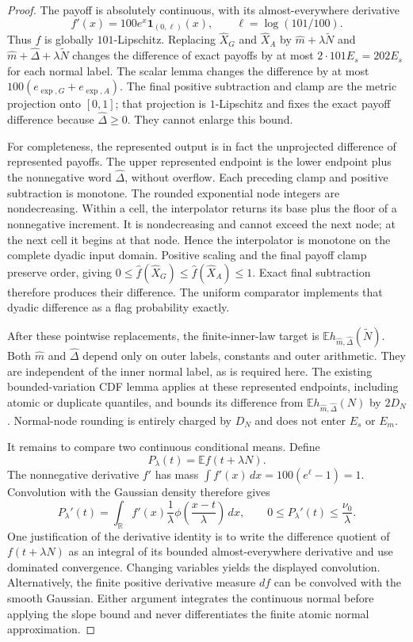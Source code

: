 \begin{proof}
The payoff is absolutely continuous, with its almost-everywhere derivative
\[
 f'(x)=100e^x\mathbf1_{(0,\ell)}(x),
 \qquad \ell=\log(101/100).
\]
Thus $f$ is globally $101$-Lipschitz. Replacing
$\widehat X_G$ and $\widehat X_A$ by
$\widehat m+\lambda\widetilde N$ and
$\widehat m+\widehat\Delta+\lambda\widetilde N$ changes the difference
of exact payoffs by at most $2\cdot101E_s=202E_s$ for each normal label.
The scalar lemma changes the difference by at most
$100(e_{\exp,G}+e_{\exp,A})$. The final positive subtraction and clamp
are the metric projection onto $[0,1]$; that projection is $1$-Lipschitz
and fixes the exact payoff difference because
$\widehat\Delta\geq0$. They cannot enlarge this bound.

For completeness, the represented output is in fact the unprojected
difference of represented payoffs. The upper represented endpoint is
the lower endpoint plus the nonnegative word $\widehat\Delta$, without
overflow. Each preceding clamp and positive subtraction is monotone.
The rounded exponential node integers are nondecreasing. Within a cell,
the interpolator returns its base plus the floor of a nonnegative
increment. It is nondecreasing and cannot exceed the next node; at the
next cell it begins at that node. Hence the interpolator is monotone on
the complete dyadic input domain. Positive scaling and the final payoff
clamp preserve order, giving $0\leq\widehat f(\widehat X_G)
\leq\widehat f(\widehat X_A)\leq1$. Exact final subtraction therefore
produces their difference. The uniform comparator implements that
dyadic difference as a flag probability exactly.

After these pointwise replacements, the finite-inner-law target is
$\mathbb E h_{\widehat m,\widehat\Delta}(\widetilde N)$.
Both $\widehat m$ and $\widehat\Delta$ depend only on outer labels,
constants and outer arithmetic. They are independent of the inner normal
label, as is required here. The existing bounded-variation CDF lemma
applies at these represented endpoints, including atomic or duplicate
quantiles, and bounds its difference from
$\mathbb E h_{\widehat m,\widehat\Delta}(N)$ by $2D_N$.
Normal-node rounding is entirely charged by $D_N$ and does not enter
$E_s$ or $E_m$.

It remains to compare two continuous conditional means. Define
\[
 P_\lambda(t)=\mathbb E f(t+\lambda N).
\]
The nonnegative derivative $f'$ has mass
$\int f'(x)\,dx=100(e^\ell-1)=1$. Convolution with the Gaussian density
therefore gives
\[
 P_\lambda'(t)
 =\int_{\mathbb R} f'(x)\frac1\lambda
             \phi\left(\frac{x-t}{\lambda}\right)\,dx,
 \qquad 0\leq P_\lambda'(t)\leq\frac{\nu_0}{\lambda}.
\]
One justification of the derivative identity is to write the difference
quotient of $f(t+\lambda N)$ as an integral of its bounded almost-everywhere
derivative and use dominated convergence. Changing variables yields the
displayed convolution. Alternatively, the finite positive derivative
measure $df$ can be convolved with the smooth Gaussian. Either argument
integrates the continuous normal before applying the slope bound and
never differentiates the finite atomic normal approximation.


\end{proof}
